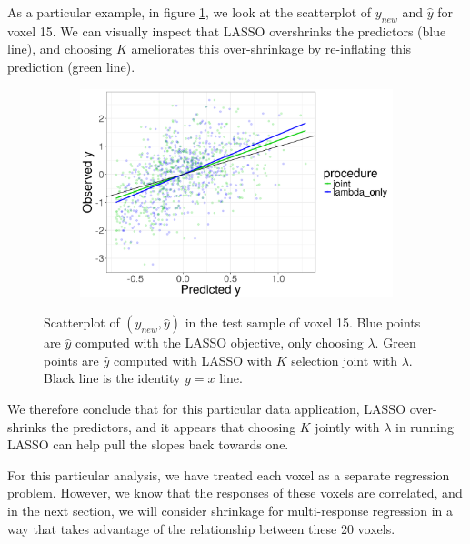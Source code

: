 \documentclass[main]{subfiles}
\begin{document}
As a particular example, in figure \ref{fig:fmri_single_response_results_scatter}, we look at the scatterplot of $y_{new}$ and $\hat y$ for voxel 15.
We can visually inspect that LASSO overshrinks the predictors (blue line), and choosing $K$ ameliorates this
over-shrinkage by re-inflating this prediction (green line).

\begin{figure}[!h]
	\centering
	\begin{subfigure}[t]{0.45\textwidth}
		\includegraphics[width = \textwidth]{./single_response_fmri_figures/obs_y_vs_pred.png}
	\end{subfigure}
  \caption{Scatterplot of $(y_{new}, \hat y)$ in the test sample of voxel 15.
	Blue points are $\hat y$ computed with the LASSO objective, only choosing $\lambda$. Green points are $\hat y$
	computed with LASSO with $K$ selection joint with $\lambda$. Black line is the identity $y = x$ line.}
	\label{fig:fmri_single_response_results_scatter}
\end{figure}

We therefore conclude that for this particular data application, LASSO over-shrinks the predictors, and
it appears that choosing $K$ jointly with $\lambda$ in running LASSO can help pull the slopes back towards one.

For this particular analysis, we have treated each voxel as a separate regression problem. However,
we know that the responses of these voxels are correlated, and in the next section, we will consider shrinkage for
multi-response regression in a way that takes advantage of the relationship between these 20 voxels.
\end{document}
